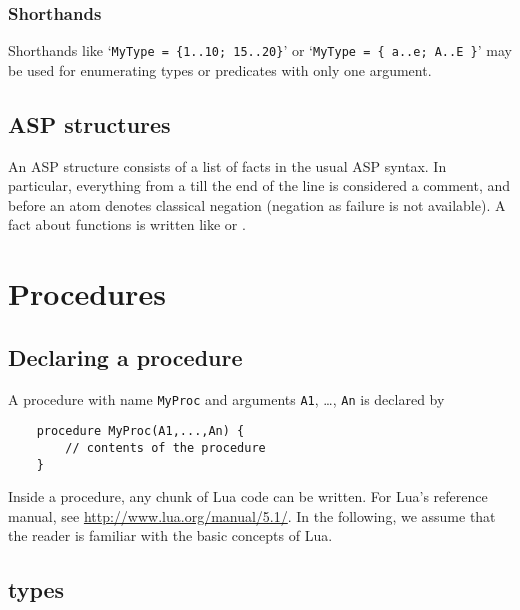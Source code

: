 \documentclass[a4]{article}
\begin{document}
\subsubsection{Shorthands}
Shorthands like `{\tt MyType = \{1..10; 15..20\}}' or `{\tt MyType = \{ a..e; A..E \}}' may be used for enumerating types or predicates with only one argument.



\subsection{ASP structures}
An ASP structure consists of a list of facts in the usual ASP syntax.  In particular, everything from a \code{\%} till the end of the line is considered a comment, and \code{-} before an atom denotes classical negation (negation as failure is not available).  A fact about functions is written like  or .




\section{Procedures}

\subsection{Declaring a procedure}

A procedure with name {\tt MyProc} and arguments {\tt A1}, \ldots, {\tt An} is declared by 
\begin{lstlisting}
	procedure MyProc(A1,...,An) {
		// contents of the procedure
	}
\end{lstlisting}
Inside a procedure, any chunk of Lua code can be written. For Lua's reference manual, see \url{http://www.lua.org/manual/5.1/}. In the following, we assume that the reader is familiar with the basic concepts of Lua.

\subsection{\idp types}
\end{document}
